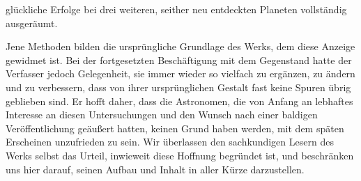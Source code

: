 glückliche Erfolge bei drei weiteren, seither neu entdeckten Planeten vollständig ausgeräumt.

Jene Methoden bilden die ursprüngliche Grundlage des Werks, dem diese Anzeige gewidmet ist. Bei der fortgesetzten Beschäftigung mit dem Gegenstand hatte der Verfasser jedoch Gelegenheit, sie immer wieder so vielfach zu ergänzen, zu ändern und zu verbessern, dass von ihrer ursprünglichen Gestalt fast keine Spuren übrig geblieben sind. Er hofft daher, dass die Astronomen, die von Anfang an lebhaftes Interesse an diesen Untersuchungen und den Wunsch nach einer baldigen Veröffentlichung geäußert hatten, keinen Grund haben werden, mit dem späten Erscheinen unzufrieden zu sein. Wir überlassen den sachkundigen Lesern des Werks selbst das Urteil, inwieweit diese Hoffnung begründet ist, und beschränken uns hier darauf, seinen Aufbau und Inhalt in aller Kürze darzustellen.


